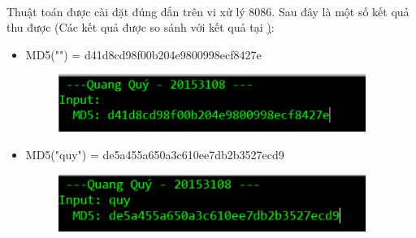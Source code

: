 \documentclass[../report.tex]{subfiles}
\begin{document}
\paragraph*{}
Thuật toán được cài đặt đúng đắn trên vi xử lý 8086. Sau đây là một số kết quả thu được (Các kết quả được so sánh với kết quả tại \href{http://www.md5.cz/}):

\begin{itemize}
    \item MD5("") = d41d8cd98f00b204e9800998ecf8427e
        \begin{figure}[H]
            \centering
            \includegraphics[width=10cm]{figures/t1.png}
        \end{figure}
        
    \item MD5("quy") = de5a455a650a3c610ee7db2b3527ecd9
        \begin{figure}[H]
            \centering
            \includegraphics[width=10cm]{figures/t2.png}
        \end{figure}
\end{itemize}
\end{document}
